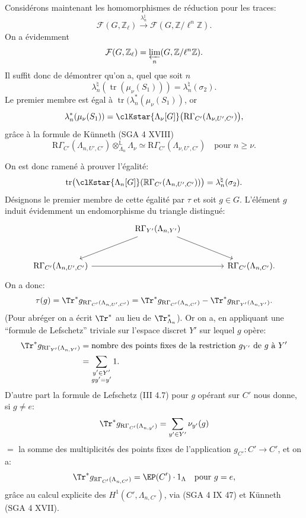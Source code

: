 Considérons maintenant les homomorphismes de réduction pour les traces:
\[
\mathcal{F}(G,\mathbb{Z}_\ell)\xrightarrow{\lambda_n^\natural}\mathcal{F}(G,\mathbb{Z}/\ell^n\mathbb{Z}).
\]
On a évidemment
\[
\mathcal{F}(G,\mathbb{Z}_\ell)=\varprojlim_n(G,\mathbb{Z}/\ell^n\mathbb{Z}).
\]
Il suffit donc de démontrer qu'on a, quel que soit $n$
\[
\lambda_n^\natural(\operatorname{tr}(\mu_\nu(S_1)))=\lambda_n^\natural(\sigma_2).
\]
Le premier membre est égal à $\operatorname{tr}(\lambda_n^*(\mu_\nu(S_1))$, or
\[
\lambda_n^*(\mu_\nu(S_1))
=
\clKstar{\Lambda_\nu[G]}\bigl(\mathrm{R}\Gamma_{C'}(\Lambda_{\nu,U',C'})\bigr),
\]
grâce à la formule de Künneth (SGA 4 XVIII)
\[
\mathrm{R}\Gamma_{C'}(\Lambda_{n,U',C'})\otimes_{\Lambda_n}^{\mathbb{L}}\Lambda_\nu
\simeq \mathrm{R}\Gamma_{C'}(\Lambda_{\nu,U',C'})
\quad\text{pour } n\ge\nu.
\]

On est donc ramené à prouver l'égalité:
\[
\operatorname{tr}\bigl(\clKstar{\Lambda_n[G]}(\mathbb{R}\Gamma_{C'}(\Lambda_{n,U',C'}))\bigr)
=
\lambda_n^\natural(\sigma_2).
\]
Désignons le premier membre de cette égalité par $\tau$ et soit $g\in G$. L'élément $g$ induit évidemment un endomorphisme du triangle distingué:
\[
\begin{tikzcd}[column sep=huge,row sep=large]
& \mathrm{R}\Gamma_{Y'}(\Lambda_{n,Y'}) \arrow[dl] \arrow[dr] & \\
\mathrm{R}\Gamma_{C'}(\Lambda_{n,U',C'}) \arrow[rr] && \mathrm{R}\Gamma_{C'}(\Lambda_{n,C'}).
\end{tikzcd}
\]
On a donc:
\[
\tau(g)=\Tr^*g_{\mathrm{R}\Gamma_{C'}(\Lambda_{n,U',C'})}
=\Tr^*g_{\mathrm{R}\Gamma_{C'}(\Lambda_{n,C'})}
-\Tr^*g_{\mathrm{R}\Gamma_{Y'}(\Lambda_{n,Y'})}.
\]
(Pour abréger on a écrit $\Tr^*$ au lieu de $\Tr^*_{\Lambda_n}$). Or on a, en appliquant une ``formule de Lefschetz'' triviale sur l'espace discret $Y'$ sur lequel $g$ opère:
\[
\begin{aligned}
\Tr^*g_{\mathrm{R}\Gamma_{Y'}(\Lambda_{n,Y'})}
&=\text{nombre des points fixes de la restriction } g_{Y'} \text{ de } g \text{ à } Y'\\
&=\sum_{\substack{y'\in Y'\\gy'=y'}}1.
\end{aligned}
\]
D'autre part la formule de Lefschetz (III 4.7) pour $g$ opérant sur $C'$ nous donne, si $g\ne e$:
\[
\Tr^*g_{\mathrm{R}\Gamma_{C'}(\Lambda_{n,y'})}
=
\sum_{y'\in Y'} \nu_{y'}(g)
\]
$=$ la somme des multiplicités des points fixes de l'application $g_{C'}:C'\to C'$, et on a:
\[
\Tr^*g_{\mathbb{R}\Gamma_{C'}(\Lambda_{n,C'})}=\EP(C')\cdot1_\Lambda
\quad\text{pour }g=e,
\]
grâce au calcul explicite des $H^1(C',\Lambda_{n,C'})$, via (SGA 4 IX 47) et
Künneth (SGA 4 XVII).

